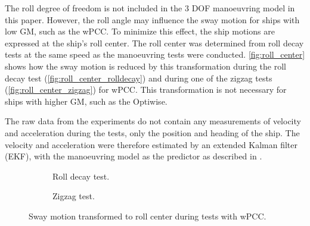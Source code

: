 \noindent The roll degree of freedom is not included in the 3 DOF manoeuvring model in this paper. However, the roll angle may influence the sway motion for ships with low GM, such as the wPCC. To minimize this effect, the ship motions are expressed at the ship's roll center. The roll center was determined from roll decay tests at the same speed as the manoeuvring tests were conducted. \autoref{fig:roll_center} shows how the sway motion is reduced by this transformation during the roll decay test (\autoref{fig:roll_center_rolldecay}) and during one of the zigzag tests (\autoref{fig:roll_center_zigzag}) for wPCC. This transformation is not necessary for ships with higher GM, such as the Optiwise.

The raw data from the experiments do not contain any measurements of velocity and acceleration during the tests, only the position and heading of the ship. The velocity and acceleration were therefore estimated by an extended Kalman filter (EKF), with the manoeuvring model as the predictor as described in \citet{alexanderssonSystemIdentificationVessel2022}.
\vspace{0.3cm}

\begin{figure}[h]
     \centering
     \begin{subfigure}[b]{0.49\textwidth}
         \centering
         
        \caption{Roll decay test.}
        \label{fig:roll_center_rolldecay}
     \end{subfigure}
     \hfill
     \begin{subfigure}[b]{0.49\textwidth}
        \centering
        
        \caption{Zigzag test.}
        \label{fig:roll_center_zigzag}
     \end{subfigure}
        \caption{Sway motion transformed to roll center during tests with wPCC.}
        \label{fig:roll_center}
\end{figure}

